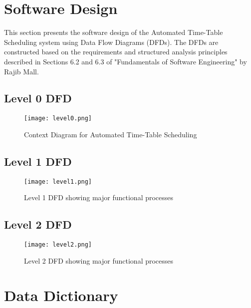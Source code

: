 \documentclass[12pt]{article}
\renewcommand{\arraystretch}{1.2}
\begin{document}
\section{Software Design}

This section presents the software design of the Automated Time-Table Scheduling system using Data Flow Diagrams (DFDs). The DFDs are constructed based on the requirements and structured analysis principles described in Sections 6.2 and 6.3 of "Fundamentals of Software Engineering" by Rajib Mall.

\subsection{Level 0 DFD}
\begin{figure}[H]
    \centering
    \texttt{[image: level0.png]} %
    \caption{Context Diagram for Automated Time-Table Scheduling}
\end{figure}

\subsection{Level 1 DFD}
\begin{figure}[H]
    \centering
    \texttt{[image: level1.png]} %
    \caption{Level 1 DFD showing major functional processes}
\end{figure}
\subsection{Level 2 DFD}
\begin{figure}[H]
    \centering
    \texttt{[image: level2.png]} %
    \caption{Level 2 DFD showing major functional processes}
\end{figure}
\newpage


\section{Data Dictionary}

\renewcommand{\arraystretch}{1.3}
\setlength{\tabcolsep}{8pt}
\end{document}
